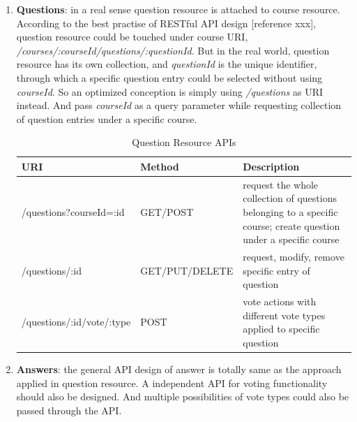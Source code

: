 \begin{enumerate}
\item
\textbf{Questions}: in a real sense question resource is attached to course resource. According to the best practise of RESTful API design [reference xxx], question resource could be touched under course URI, \textit{/courses/:courseId/questions/:questionId}. But in the real world, question resource has its own collection, and \textit{questionId} is the unique identifier, through which a specific question entry could be selected without using  
\textit{courseId}. So an optimized conception is simply using \textit{/questions} as URI instead. And pass \textit{courseId} as a query parameter while requesting collection of question entries under a specific course. 
\begin{table}[!htbp]
\centering

\begin{tabularx}{\textwidth}{@{}llX@{}}
\toprule
URI                                   & Method         & Description                                                                                                                                                 \\ \midrule
/questions?courseId=:id               & GET/POST       & request the whole collection of questions belonging to a specific course; create question under a specific course \\
/questions/:id                & GET/PUT/DELETE & request, modify, remove specific entry of question                                                                                                          \\
/questions/:id/vote/:type      & POST          & vote actions with different vote types applied to specific question  \\ \bottomrule
\end{tabularx}
\caption{Question Resource APIs}
\label{table:question-resource-apis}
\end{table}


\item
\textbf{Answers}: the general API design of answer is totally same as the approach applied in question resource. A independent API for voting functionality should also be designed. And multiple possibilities of vote types could also be passed through the API.

\begin{table}[!htbp]
\centering


\end{table}
\end{enumerate}
